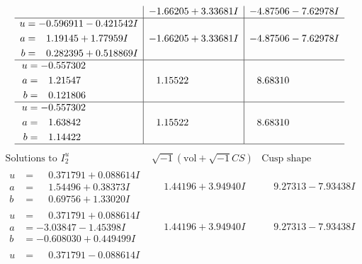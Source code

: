 \documentclass[1p]{elsarticle_modified}
\theoremstyle{definition}
\newcommand{\I}{\sqrt{-1}}
\begin{document}
$$\begin{array}{c|c|c}
 & -1.66205 + 3.33681 I & -4.87506 - 7.62978 I \\ \hline\begin{aligned}
u &= -0.596911 - 0.421542 I \\
a &= \phantom{-}1.19145 + 1.77959 I \\
b &= \phantom{-}0.282395 + 0.518869 I\end{aligned}
 & -1.66205 + 3.33681 I & -4.87506 - 7.62978 I \\ \hline\begin{aligned}
u &= -0.557302\phantom{ +0.000000I} \\
a &= \phantom{-}1.21547\phantom{ +0.000000I} \\
b &= \phantom{-}0.121806\phantom{ +0.000000I}\end{aligned}
 & \phantom{-}1.15522\phantom{ +0.000000I} & \phantom{-}8.68310\phantom{ +0.000000I} \\ \hline\begin{aligned}
u &= -0.557302\phantom{ +0.000000I} \\
a &= \phantom{-}1.63842\phantom{ +0.000000I} \\
b &= \phantom{-}1.14422\phantom{ +0.000000I}\end{aligned}
 & \phantom{-}1.15522\phantom{ +0.000000I} & \phantom{-}8.68310\phantom{ +0.000000I}\\
 \hline 
 \end{array}$$\newpage$$\begin{array}{c|c|c}  
\text{Solutions to }I^u_{2}& \I (\text{vol} + \sqrt{-1}CS) & \text{Cusp shape}\\
 \hline 
\begin{aligned}
u &= \phantom{-}0.371791 + 0.088614 I \\
a &= \phantom{-}1.54496 + 0.38373 I \\
b &= \phantom{-}0.69756 + 1.33020 I\end{aligned}
 & \phantom{-}1.44196 + 3.94940 I & \phantom{-}9.27313 - 7.93438 I \\ \hline\begin{aligned}
u &= \phantom{-}0.371791 + 0.088614 I \\
a &= -3.03847 - 1.45398 I \\
b &= -0.608030 + 0.449499 I\end{aligned}
 & \phantom{-}1.44196 + 3.94940 I & \phantom{-}9.27313 - 7.93438 I \\ \hline\begin{aligned}
u &= \phantom{-}0.371791 - 0.088614 I \\

\end{aligned}
\end{array}$$
\end{document}
